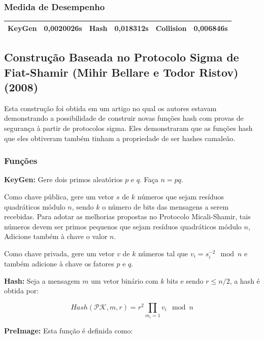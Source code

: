 \documentclass[a4paper]{article}
\begin{document}
    \subsubsection{Medida de Desempenho}
    
    \begin{center}
    \begin{tabular}{|c|c|c|c|c|c|}
      \hline
      KeyGen & 0,0020026s & Hash & 0,018312s & Collision & 0,006846s\\
      \hline
    \end{tabular}
    \end{center}
    
    
    \subsection{Construção Baseada no Protocolo Sigma de Fiat-Shamir
      (Mihir Bellare e Todor Ristov) (2008)\cite{sigma}}
    
    Esta construção foi obtida em um artigo no qual os autores estavam
    demonstrando a possibilidade de construir novas funções hash com
    provas de segurança à partir de protocolos sigma. Eles demonstraram
    que as funções hash que eles obtiveram também tinham a propriedade de
    ser hashes camaleão.
    
    \subsubsection{Funções}
    
    \textbf{KeyGen: } Gere dois primos aleatórios $p$ e $q$. Faça $n=pq$.
    
    Como chave pública, gere um vetor $s$ de $k$ números que sejam
    resíduos quadráticos módulo $n$, sendo $k$ o número de bits das
    mensagens a serem recebidas. Para adotar as melhorias propostas no
    Protocolo Micali-Shamir, tais números devem ser primos pequenos que
    sejam resíduos quadráticos módulo $n$, Adicione também à chave o valor
    $n$.
    
    Como chave privada, gere um vetor $v$ de $k$ números tal que
    $v_i=s_i^{-2} \mod n$ e também adicione à chave os fatores $p$ e $q$.
    
    \textbf{Hash: } Seja a mensagem $m$ um vetor binário com $k$ bits e
    sendo $r \leq n/2$, a hash é obtida por:
    
    $$ Hash(\mathcal{PK}, m, r) = r^2\prod_{m_i=1}v_i \mod n
    $$
    
    \textbf{PreImage: } Esta função é definida como:
    
\end{document}
